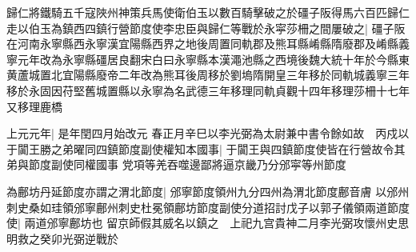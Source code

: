 歸仁將鐵騎五千寇陜州神策兵馬使衛伯玉以數百騎擊破之於礓子阪得馬六百匹歸仁走以伯玉為鎮西四鎮行營節度使李忠臣與歸仁等戰於永寜莎柵之間屢破之|{
	礓子阪在河南永寧縣西永寧漢宜陽縣西界之地後周置同軌郡及熊耳縣崤縣隋廢郡及崤縣義寧元年改為永寧縣礓居良翻宋白曰永寧縣本漢澠池縣之西境後魏大統十年於今縣東黄蘆城置北宜陽縣廢帝二年改為熊耳後周移於劉塢隋開皇三年移於同軌城義寧三年移於永固因苻堅舊城置縣以永寧為名武德三年移理同軌貞觀十四年移理莎柵十七年又移理鹿橋}


上元元年|{
	是年閏四月始改元}
春正月辛巳以李光弼為太尉兼中書令餘如故　丙戍以于闐王勝之弟曜同四鎮節度副使權知本國事|{
	于闐王與四鎮節度使皆在行營故令其弟與節度副使同權國事}
党項等羌吞噬邊鄙將逼京畿乃分邠寜等州節度

為鄜坊丹延節度亦謂之渭北節度|{
	邠寧節度領州九分四州為渭北節度鄜音膚}
以邠州刺史桑如珪領邠寧鄜州刺史杜冕領鄜坊節度副使分道招討戊子以郭子儀領兩道節度使|{
	兩道邠寧鄜坊也}
留京師假其威名以鎮之　上祀九宫貴神二月李光弼攻懷州史思明救之癸卯光弼逆戰於

